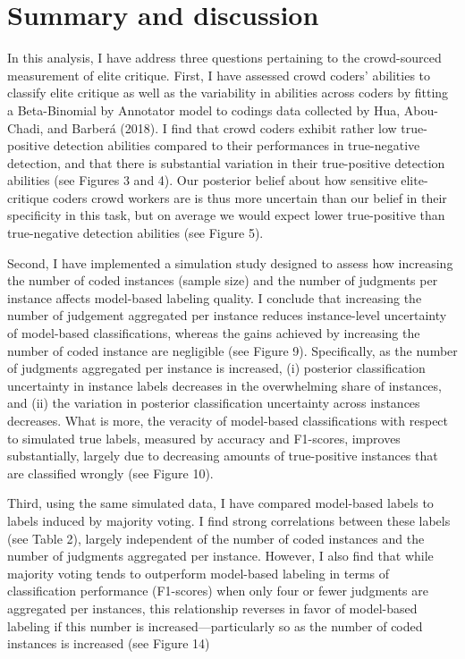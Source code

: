 \documentclass[12pt,]{article}
\begin{document}
\hypertarget{summary-and-discussion}{%
\section{Summary and discussion}\label{summary-and-discussion}}

In this analysis, I have address three questions pertaining to the
crowd-sourced measurement of elite critique. First, I have assessed
crowd coders' abilities to classify elite critique as well as the
variability in abilities across coders by fitting a Beta-Binomial by
Annotator model to codings data collected by Hua, Abou-Chadi, and
Barberá (2018). I find that crowd coders exhibit rather low
true-positive detection abilities compared to their performances in
true-negative detection, and that there is substantial variation in
their true-positive detection abilities (see Figures 3 and 4). Our
posterior belief about how sensitive elite-critique coders crowd workers
are is thus more uncertain than our belief in their specificity in this
task, but on average we would expect lower true-positive than
true-negative detection abilities (see Figure 5).

Second, I have implemented a simulation study designed to assess how
increasing the number of coded instances (sample size) and the number of
judgments per instance affects model-based labeling quality. I conclude
that increasing the number of judgement aggregated per instance reduces
instance-level uncertainty of model-based classifications, whereas the
gains achieved by increasing the number of coded instance are negligible
(see Figure 9). Specifically, as the number of judgments aggregated per
instance is increased, (i) posterior classification uncertainty in
instance labels decreases in the overwhelming share of instances, and
(ii) the variation in posterior classification uncertainty across
instances decreases. What is more, the veracity of model-based
classifications with respect to simulated true labels, measured by
accuracy and F1-scores, improves substantially, largely due to
decreasing amounts of true-positive instances that are classified
wrongly (see Figure 10).

Third, using the same simulated data, I have compared model-based labels
to labels induced by majority voting. I find strong correlations between
these labels (see Table 2), largely independent of the number of coded
instances and the number of judgments aggregated per instance. However,
I also find that while majority voting tends to outperform model-based
labeling in terms of classification performance (F1-scores) when only
four or fewer judgments are aggregated per instances, this relationship
reverses in favor of model-based labeling if this number is
increased---particularly so as the number of coded instances is
increased (see Figure 14)
\end{document}
